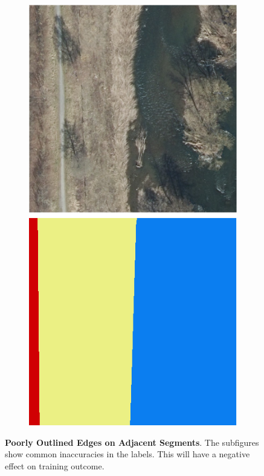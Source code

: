 \begin{figure}[h]
\begin{subfigure}{0.22\textwidth}
        \caption{}
        \label{fig:label_considerations_c}
    \end{subfigure}
    \hfill
    \begin{subfigure}{0.22\textwidth}
        \includegraphics[width=\textwidth]{images/consideration_labels/71270}
        \caption{}
        \label{fig:label_considerations_d}
    \end{subfigure}

    \caption[Poorly Outlined Edges on Adjacent Segments]
    {\textbf{Poorly Outlined Edges on Adjacent Segments}. The subfigures show common inaccuracies in the labels. This will have a negative effect on training outcome.}
    \label{fig:label_considerations}
\end{figure}

